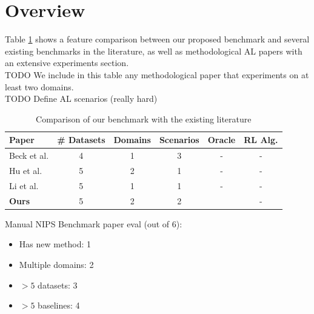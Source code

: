 \documentclass[]{article}
\begin{document}
\section{Overview}
Table \ref{tab:benchmark_comparison} shows a feature comparison between our proposed benchmark and several existing benchmarks in the literature, as well as methodological AL papers with an extensive experiments section. \\
{\color{red} TODO} We include in this table any methodological paper that experiments on at least two domains. \\
{\color{red} TODO} Define AL scenarios (really hard)
\begin{table}[h]
	\centering
	\begin{tabular}{l | c c c c c}
		Paper & \# Datasets & Domains & Scenarios & Oracle & RL Alg. \\
		\hline
		Beck et al. \cite{beck2021effective} & 4 & 1 & 3 & - & - \\
		Hu et al. \cite{hu2021towards} & 5 & 2 & 1 & - & - \\
		Li et al. \cite{li2022empirical} & 5 & 1 & 1 & - & - \\
		\textbf{Ours} & 5 & 2 & 2 & \checkmark & -
	\end{tabular}
	\caption{Comparison of our benchmark with the existing literature}
	\label{tab:benchmark_comparison}
\end{table}

Manual NIPS Benchmark paper eval (out of 6):
\begin{itemize}
	\item Has new method: 1
	\item Multiple domains: 2
	\item $> 5$ datasets: 3
	\item $> 5$ baselines: 4
\end{itemize}


\end{document}
